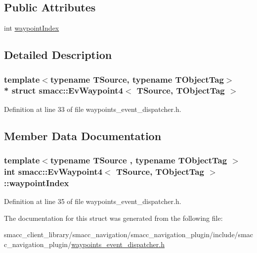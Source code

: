 \subsection*{Public Attributes}
\begin{DoxyCompactItemize}
\item 
int \hyperlink{structsmacc_1_1EvWaypoint4_ac943492ea5681667dc5b9627f4428216}{waypoint\+Index}
\end{DoxyCompactItemize}


\subsection{Detailed Description}
\subsubsection*{template$<$typename T\+Source, typename T\+Object\+Tag$>$\\*
struct smacc\+::\+Ev\+Waypoint4$<$ T\+Source, T\+Object\+Tag $>$}



Definition at line 33 of file waypoints\+\_\+event\+\_\+dispatcher.\+h.



\subsection{Member Data Documentation}
\subsubsection[{\texorpdfstring{waypoint\+Index}{waypointIndex}}]{\setlength{\rightskip}{0pt plus 5cm}template$<$typename T\+Source , typename T\+Object\+Tag $>$ int {\bf smacc\+::\+Ev\+Waypoint4}$<$ T\+Source, T\+Object\+Tag $>$\+::waypoint\+Index}\hypertarget{structsmacc_1_1EvWaypoint4_ac943492ea5681667dc5b9627f4428216}{}\label{structsmacc_1_1EvWaypoint4_ac943492ea5681667dc5b9627f4428216}


Definition at line 35 of file waypoints\+\_\+event\+\_\+dispatcher.\+h.



The documentation for this struct was generated from the following file\+:\begin{DoxyCompactItemize}
\item 
smacc\+\_\+client\+\_\+library/smacc\+\_\+navigation/smacc\+\_\+navigation\+\_\+plugin/include/smacc\+\_\+navigation\+\_\+plugin/\hyperlink{waypoints__event__dispatcher_8h}{waypoints\+\_\+event\+\_\+dispatcher.\+h}\end{DoxyCompactItemize}
